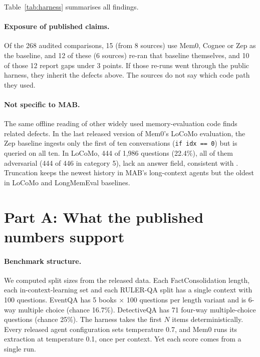 \documentclass[11pt,a4paper]{article}
\begin{document}
Table~\ref{tab:harness} summarises all findings.



\paragraph{Exposure of published claims.} Of the 268 audited comparisons, 15 (from 8 sources) use Mem0, Cognee or
Zep as the baseline, and 12 of these (6 sources) re-ran that baseline themselves, and 10 of those 12 report gaps under 3 points. If those
re-runs went through the public harness, they inherit the defects above. The sources do not say which code path they used.

\paragraph{Not specific to MAB.} The same offline reading of other widely used memory-evaluation code finds related
defects. In the last released version of Mem0's LoCoMo evaluation, the Zep baseline ingests only the first of ten
conversations (\texttt{if idx == 0}) but is queried on all ten. In LoCoMo, 444 of 1{,}986 questions (22.4\%), all
of them adversarial (444 of 446 in category 5), lack an answer field, consistent with \citet{tanguturi2026atant}. Truncation keeps the newest history in
MAB's long-context agents but the oldest in LoCoMo and LongMemEval baselines.

\section{Part A: What the published numbers support}
\label{sec:audit}
\paragraph{Benchmark structure.} We computed split sizes from the released data. Each FactConsolidation
length, each in-context-learning set and each RULER-QA split has a single context with 100 questions. EventQA
has 5 books $\times$ 100 questions per length variant and is 6-way multiple choice (chance 16.7\%). DetectiveQA
has 71 four-way multiple-choice questions (chance 25\%). The harness takes the first $N$ items
deterministically. Every released agent configuration sets temperature 0.7, and Mem0 runs its extraction
at temperature 0.1, once per context. Yet each score comes from a single run.
\end{document}

